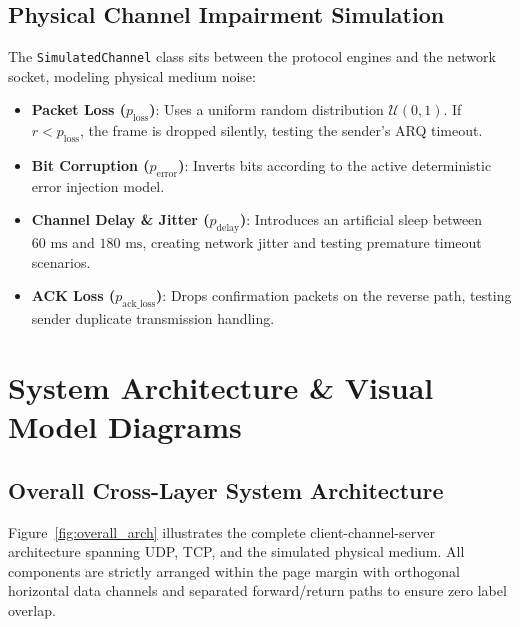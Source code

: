 \documentclass[12pt, a4paper]{article}
\begin{document}
\subsection{Physical Channel Impairment Simulation}
The \texttt{SimulatedChannel} class sits between the protocol engines and the network socket, modeling physical medium noise:
\begin{itemize}
    \item \textbf{Packet Loss ($p_{\text{loss}}$)}: Uses a uniform random distribution $\mathcal{U}(0, 1)$. If $r < p_{\text{loss}}$, the frame is dropped silently, testing the sender's ARQ timeout.
    \item \textbf{Bit Corruption ($p_{\text{error}}$)}: Inverts bits according to the active deterministic error injection model.
    \item \textbf{Channel Delay \& Jitter ($p_{\text{delay}}$)}: Introduces an artificial sleep between $60\text{ ms}$ and $180\text{ ms}$, creating network jitter and testing premature timeout scenarios.
    \item \textbf{ACK Loss ($p_{\text{ack\_loss}}$)}: Drops confirmation packets on the reverse path, testing sender duplicate transmission handling.
\end{itemize}

\section{System Architecture \& Visual Model Diagrams}

\subsection{Overall Cross-Layer System Architecture}
Figure~\ref{fig:overall_arch} illustrates the complete client-channel-server architecture spanning UDP, TCP, and the simulated physical medium. All components are strictly arranged within the page margin with orthogonal horizontal data channels and separated forward/return paths to ensure zero label overlap.
\end{document}
